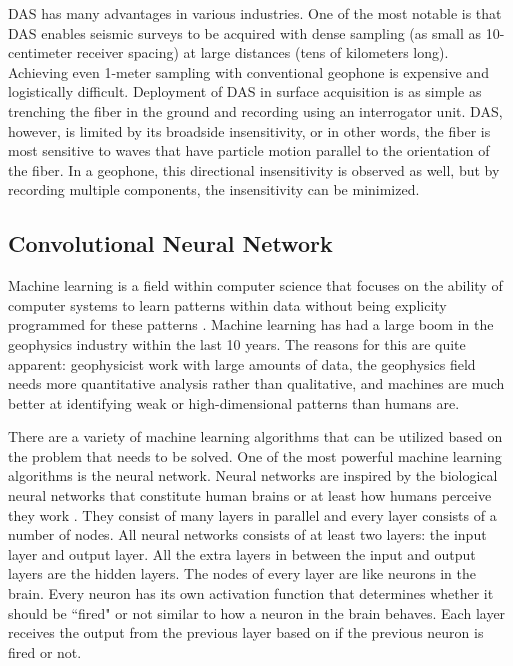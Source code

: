 DAS has many advantages in various industries. One of the most notable is that DAS enables seismic surveys to be acquired with dense sampling (as small as 10-centimeter receiver spacing) at large distances (tens of kilometers long). Achieving even 1-meter sampling with conventional geophone is expensive and logistically difficult. Deployment of DAS in surface acquisition is as simple as trenching the fiber in the ground and recording using an interrogator unit. DAS, however, is limited by its broadside insensitivity, or in other words, the fiber is most sensitive to waves that have particle motion parallel to the orientation of the fiber. In a geophone, this directional insensitivity is observed as well, but by recording multiple components, the insensitivity can be minimized.

\subsection{Convolutional Neural Network}
Machine learning is a field within computer science that focuses on the ability of computer systems to learn patterns within data without being explicity programmed for these patterns \citep{samuel1959some}. Machine learning has had a large boom in the geophysics industry within the last 10 years. The reasons for this are quite apparent: geophysicist work with large amounts of data, the geophysics field needs more quantitative analysis rather than qualitative, and machines are much better at identifying weak or high-dimensional patterns than humans are.

There are a variety of machine learning algorithms that can be utilized based on the problem that needs to be solved. One of the most powerful machine learning algorithms is the neural network. Neural networks are inspired by the biological neural networks that constitute human brains or at least how humans perceive they work \citep{Gerven2018}. They consist of many layers in parallel and every layer consists of a number of nodes. All neural networks consists of at least two layers: the input layer and output layer. All the extra layers in between the input and output layers are the hidden layers. The nodes of every layer are like neurons in the brain. Every neuron has its own activation function that determines whether it should be ``fired" or not similar to how a neuron in the brain behaves. Each layer receives the output from the previous layer based on if the previous neuron is fired or not.

